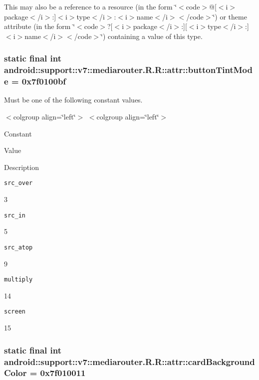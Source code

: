 This may also be a reference to a resource (in the form \char`\"{}$<$code$>$@\mbox{[}$<$i$>$package$<$/i$>$:\mbox{]}$<$i$>$type$<$/i$>$:$<$i$>$name$<$/i$>$$<$/code$>$\char`\"{}) or theme attribute (in the form \char`\"{}$<$code$>$?\mbox{[}$<$i$>$package$<$/i$>$:\mbox{]}\mbox{[}$<$i$>$type$<$/i$>$:\mbox{]}$<$i$>$name$<$/i$>$$<$/code$>$\char`\"{}) containing a value of this type. \hypertarget{classandroid_1_1support_1_1v7_1_1mediarouter_1_1_r_1_1attr_a3a8ed3c919175ccd7d4c04eb7c78ce1}{
\subsubsection[{buttonTintMode}]{\setlength{\rightskip}{0pt plus 5cm}static final int android::support::v7::mediarouter.R.R::attr::buttonTintMode = 0x7f0100bf}}
\label{classandroid_1_1support_1_1v7_1_1mediarouter_1_1_r_1_1attr_a3a8ed3c919175ccd7d4c04eb7c78ce1}


Must be one of the following constant values. \begin{TabularC}{0}
\hline
\end{TabularC}
$<$colgroup align=\char`\"{}left\char`\"{}$>$ $<$colgroup align=\char`\"{}left\char`\"{}$>$ 

Constant

Value

Description 

{\tt src\_\-over}

3

{\tt src\_\-in}

5

{\tt src\_\-atop}

9

{\tt multiply}

14

{\tt screen}

15\hypertarget{classandroid_1_1support_1_1v7_1_1mediarouter_1_1_r_1_1attr_9287b4e04f2078ad7d5a1cac56e1ae71}{
\subsubsection[{cardBackgroundColor}]{\setlength{\rightskip}{0pt plus 5cm}static final int android::support::v7::mediarouter.R.R::attr::cardBackgroundColor = 0x7f010011}}
\label{classandroid_1_1support_1_1v7_1_1mediarouter_1_1_r_1_1attr_9287b4e04f2078ad7d5a1cac56e1ae71}


